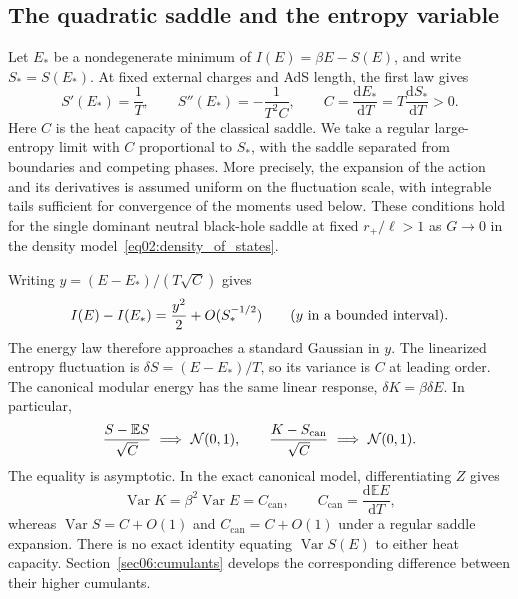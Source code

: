 \documentclass[11pt,letterpaper]{article}
\newcommand{\E}{\mathbb{E}}
\DeclareMathOperator{\Var}{Var}
\newcommand{\dd}{\mathrm{d}}
\theoremstyle{plain}
\theoremstyle{definition}
\theoremstyle{remark}
\begin{document}
\subsection{The quadratic saddle and the entropy variable}

Let $E_*$ be a nondegenerate minimum of $I(E)=\beta E-S(E)$, and write $S_*=S(E_*)$. At fixed external charges and AdS length, the first law gives
\begin{equation}
 S'(E_*)=\frac1T,\qquad
 S''(E_*)=-\frac{1}{T^2C},\qquad
 C=\frac{\dd E_*}{\dd T}=T\frac{\dd S_*}{\dd T}>0.
 \label{eq10:quadratic_capacity}
\end{equation}
Here $C$ is the heat capacity of the classical saddle. We take a regular large-entropy limit with $C$ proportional to $S_*$, with the saddle separated from boundaries and competing phases. More precisely, the expansion of the action and its derivatives is assumed uniform on the fluctuation scale, with integrable tails sufficient for convergence of the moments used below. These conditions hold for the single dominant neutral black-hole saddle at fixed $r_+/\ell>1$ as $G\to0$ in the density model~\eqref{eq02:density_of_states}.

Writing $y=(E-E_*)/(T\sqrt C)$ gives
\begin{equation}
 I(E)-I(E_*)=\frac{y^2}{2}
 +O(S_*^{-1/2})\qquad (y\ \hbox{in a bounded interval}).
 \label{eq10:quadratic_action}
\end{equation}
The energy law therefore approaches a standard Gaussian in $y$. The linearized entropy fluctuation is $\delta S=(E-E_*)/T$, so its variance is $C$ at leading order. The canonical modular energy has the same linear response, $\delta K=\beta\delta E$. In particular,
\begin{equation}
 \frac{S-\E S}{\sqrt C}\ \Longrightarrow\ {\cal N}(0,1),
 \qquad
 \frac{K-S_{\mathrm{can}}}{\sqrt C}\ \Longrightarrow\ {\cal N}(0,1).
 \label{eq10:regular_limit}
\end{equation}
The equality is asymptotic. In the exact canonical model, differentiating $Z$ gives
\begin{equation}
 \Var K=\beta^2\Var E=C_{\mathrm{can}},\qquad
 C_{\mathrm{can}}=\frac{\dd\E E}{\dd T},
 \label{eq10:exact_capacity}
\end{equation}
whereas $\Var S=C+O(1)$ and $C_{\mathrm{can}}=C+O(1)$ under a regular saddle expansion. There is no exact identity equating $\Var S(E)$ to either heat capacity. Section~\ref{sec06:cumulants} develops the corresponding difference between their higher cumulants.
\end{document}
